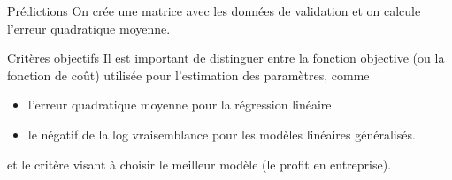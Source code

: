 \documentclass[
  ignorenonframetext,
]{beamer}
\newenvironment{Shaded}{\begin{snugshade}}{\end{snugshade}}
\newcommand{\AttributeTok}[1]{\textcolor[rgb]{0.40,0.45,0.13}{#1}}
\newcommand{\CommentTok}[1]{\textcolor[rgb]{0.37,0.37,0.37}{#1}}
\newcommand{\DecValTok}[1]{\textcolor[rgb]{0.68,0.00,0.00}{#1}}
\newcommand{\FunctionTok}[1]{\textcolor[rgb]{0.28,0.35,0.67}{#1}}
\newcommand{\NormalTok}[1]{\textcolor[rgb]{0.00,0.23,0.31}{#1}}
\newcommand{\OtherTok}[1]{\textcolor[rgb]{0.00,0.23,0.31}{#1}}
\newcommand{\SpecialCharTok}[1]{\textcolor[rgb]{0.37,0.37,0.37}{#1}}
\providecommand{\tightlist}{%
  \setlength{\itemsep}{0pt}\setlength{\parskip}{0pt}}\usepackage{longtable,booktabs,array}
\begin{document}
\begin{frame}[fragile]{Prédictions}
\label{pruxe9dictions}
On crée une matrice avec les données de validation et on calcule
l'erreur quadratique moyenne.

\footnotesize

\begin{Shaded}
\end{Shaded}

\normalsize
\end{frame}

\begin{frame}{Critères objectifs}
\label{crituxe8res-objectifs}
Il est important de distinguer entre la fonction objective (ou la
fonction de coût) utilisée pour l'estimation des paramètres, comme

\begin{itemize}
\tightlist
\item
  l'erreur quadratique moyenne pour la régression linéaire
\item
  le négatif de la log vraisemblance pour les modèles linéaires
  généralisés.
\end{itemize}

et le critère visant à choisir le meilleur modèle (le profit en
entreprise).
\end{frame}
\end{document}
